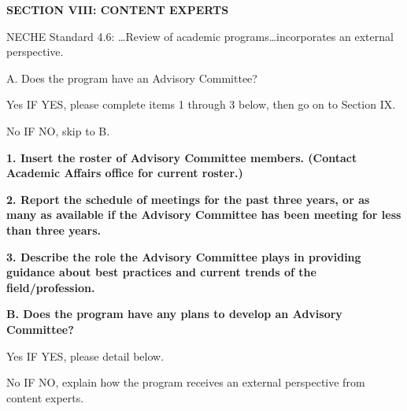 \textbf{SECTION VIII: CONTENT EXPERTS}

NECHE Standard 4.6: …Review of academic programs…incorporates an external perspective.

A. Does the program have an Advisory Committee?
\begin{itemize}

  \begin{todolist}
  \item [\done] Yes IF YES, please complete items 1 through 3 below, then go on to Section IX.
  \item No IF NO, skip to B.

  \end{todolist}
\end{itemize}







\textbf{1. Insert the roster of Advisory Committee members. (Contact Academic Affairs office for current roster.)}



\textbf{2. Report the schedule of meetings for the past three years, or as many as available if the Advisory Committee has been meeting for less than three years.}




\textbf{3. Describe the role the Advisory Committee plays in providing guidance about best practices and current trends of the field/profession.}





\textbf{B. Does the program have any plans to develop an Advisory Committee?}
\begin{itemize}

  \begin{todolist}
  \item [\done]Yes 	IF YES, please detail below.
  \item No IF NO, explain how the program receives an external perspective from content experts.

  \end{todolist}
\end{itemize}





